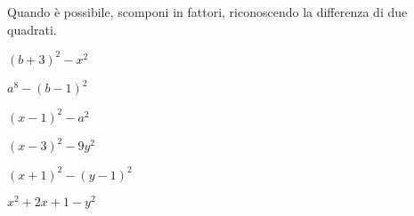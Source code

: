 
\begin{esercizio}[*]
\label{ese:div.018}
Quando è possibile, scomponi in fattori, riconoscendo la differenza di due 
quadrati.
\begin{htmulticols}{2}
\begin{enumeratea}
\item \((b+3)^{2}-x^{2}\) 
\item \(a^{8}-(b-1)^{2}\) 
\item \((x-1)^{2}-a^{2}\) 
\item \((x-3)^{2}-9y^{2}\) 
\item \((x+1)^{2}-(y-1)^{2}\) 
\item \(x^{2}+2x+1-y^{2}\) 
\end{enumeratea}
\end{htmulticols}
\end{esercizio}

